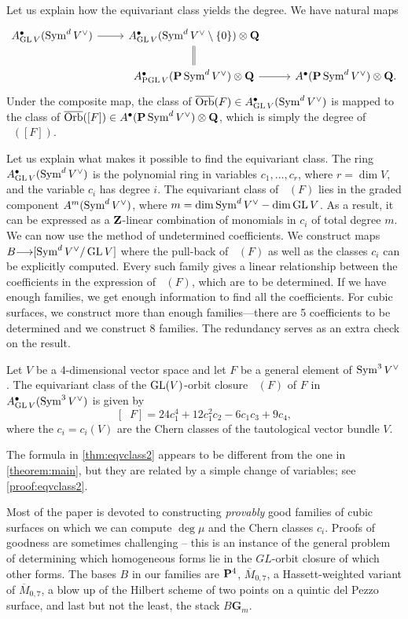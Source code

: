 \documentclass[12pt,reqno]{amsart}
\DeclareMathOperator{\Orb}{\overline{Orb}}
\renewcommand{\to}{{\longrightarrow}}
\numberwithin{equation}{section}
\newcommand{\G}{\mathbf G}
\begin{document}
Let us explain how the equivariant class yields the degree.
We have natural maps
\[
\begin{tikzcd}
  A^\bullet_{\GL V}(\Sym^dV^\vee) \ar{r}& A^\bullet_{\GL V}(\Sym^d V^\vee \setminus
  \{0\}) \otimes \Q \ar[equal]{d}\\
  &A^\bullet_{\PGL V}(\P \Sym^dV^\vee) \otimes \Q \ar{r}&
  A^\bullet(\P \Sym^dV^\vee) \otimes \Q.
\end{tikzcd}
\]
Under the composite map, the class of $\Orb(F) \in A^\bullet_{\GL
  V}(\Sym^dV^\vee)$ is mapped to the class of $\Orb([F]) \in
A^\bullet(\P \Sym^dV^\vee) \otimes \Q$, which is simply the degree of $\Orb([F])$.

Let us explain what makes it possible to find the equivariant
class.  The ring $A^\bullet_{\GL V}(\Sym^dV^\vee)$ is the polynomial ring
in variables $c_1, \dots, c_r$, where $r = \dim V$, and the variable
$c_i$ has degree $i$.  The equivariant class of $\Orb(F)$ lies in the
graded component $A^m(\Sym^dV^\vee)$, where
$m = \dim \Sym^d V^\vee - \dim \GL V$.  As a result, it can be expressed as
a $\Z$-linear combination of monomials in $c_i$ of total degree
$m$. We can now use the method of undetermined coefficients.  We
construct maps $B \to [\Sym^dV^\vee/\GL V]$ where the pull-back of
$\Orb(F)$ as well as the classes $c_i$ can be explicitly
computed. Every such family gives a linear relationship between the
coefficients in the expression of $\Orb(F)$, which are to be determined.
If we have enough families, we get enough information to find all the coefficients.
For cubic surfaces, we construct more than enough families---there are 5
coefficients to be determined and we construct 8 families. The redundancy
serves as an extra check on the result.
\begin{theorem}\label{thm:eqvclass2}
  Let $V$ be a 4-dimensional vector space and let $F$ be a general
  element of $\Sym^3 V^\vee$.
  The equivariant class of the $\GL(V)$-orbit closure $\Orb(F)$ of $F$
  in $A^\bullet_{\GL V}(\Sym^3 V^\vee)$ is given by
  \[
    [\Orb F] = 24c_1^4 + 12c_1^2c_2 - 6c_1c_3 + 9c_4,
  \]
  where the \(c_i = c_i(V)\) are the Chern classes of the tautological vector
  bundle $V$.
\end{theorem}
The formula in \autoref{thm:eqvclass2} appears to be different from the one
in \autoref{theorem:main}, but they are related by a simple change of
variables; see \autoref{proof:eqvclass2}.

Most of the paper is devoted to constructing {\sl provably} good
families of cubic surfaces on which we can compute $\deg \mu$ and the
Chern classes $c_i$.  Proofs of goodness are sometimes challenging --
this is an instance of the general problem of determining which
homogeneous forms lie in the $GL$-orbit closure of which other
forms. The bases $B$ in our families are $\P^4$, $\overline M_{0,7}$,
a Hassett-weighted variant of $\overline M_{0,7}$, a blow up of the
Hilbert scheme of two points on a quintic del Pezzo surface, and last
but not the least, the stack $B\G_m$.
\end{document}
